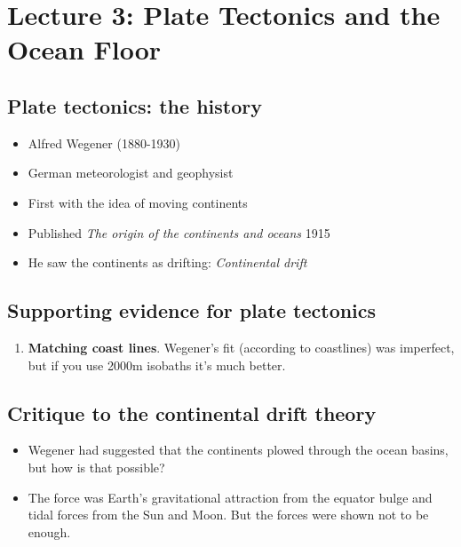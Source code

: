 \section{Lecture 3: Plate Tectonics and the Ocean Floor}

\subsection{Plate tectonics: the history}

\begin{itemize}
    \item Alfred Wegener (1880-1930)
    \item German meteorologist and geophysist
    \item First with the idea of moving continents
    \item Published \textit{The origin of the continents and oceans} 1915
    \item He saw the continents as drifting: \textit{Continental drift}
\end{itemize}


\subsection{Supporting evidence for plate tectonics}

\begin{enumerate}
    \item \textbf{Matching coast lines}. Wegener's fit (according to
        coastlines) was imperfect, but if you
        use 2000m isobaths it's much better.
\end{enumerate}

\subsection{Critique to the continental drift theory}

\begin{itemize}
    \item Wegener had suggested that the continents plowed through the ocean
        basins, but how is that possible?
    \item The force was Earth's gravitational attraction from the equator
        bulge and tidal forces from the Sun and Moon. But the forces were shown
        not to be enough.
\end{itemize}

